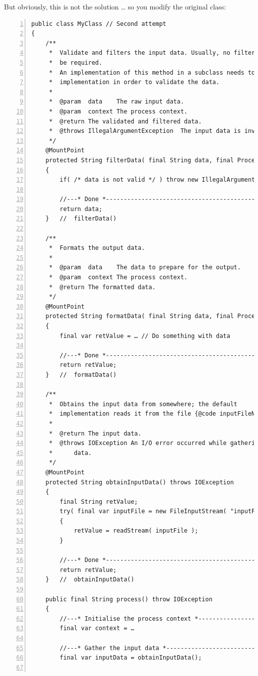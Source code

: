 \documentclass[11pt,a4paper, titlepage, parskip=half, headsepline, footsepline, cleardoublepage=current, headheight=1cm]{scrbook}
\begin{document}
But obviously, this is not the solution … so you modify the original class:
\begin{lstlisting}[numbers=left]
public class MyClass // Second attempt
{
    /**
     *  Validate and filters the input data. Usually, no filtering should
     *  be required.
     *  An implementation of this method in a subclass needs to call this
     *  implementation in order to validate the data.
     *  
     *  @param  data    The raw input data.
     *  @param  context The process context.
     *  @return	The validated and filtered data.
     *  @throws IllegalArgumentException  The input data is invalid.
     */
    @MountPoint 
    protected String filterData( final String data, final ProcessContext context )
    {
        if( /* data is not valid */ ) throw new IllegalArgumentException();
        
        //---* Done *------------------------------------------------
        return data;
    }   //  filterData()
    
    /**
     *  Formats the output data.
     * 
     *  @param  data    The data to prepare for the output.
     *  @param  context The process context.
     *  @return	The formatted data.
     */
    @MountPoint
    protected String formatData( final String data, final ProcessContext context )
    {
        final var retValue = … // Do something with data
        
        //---* Done *------------------------------------------------
        return retValue;
    }   //  formatData()
    
    /**
     *  Obtains the input data from somewhere; the default 
     *  implementation reads it from the file {@code inputFileName}.
     *
     *  @return The input data.
     *  @throws IOException An I/O error occurred while gathering the 
     *      data.
     */
    @MountPoint
    protected String obtainInputData() throws IOException
    {
        final String retValue;
        try( final var inputFile = new FileInputStream( "inputFileName" ) )
        {
            retValue = readStream( inputFile );
        }
        
        //---* Done *------------------------------------------------
        return retValue;
    }   //  obtainInputData()
        
    public final String process() throw IOException
    {
        //---* Initialise the process context *----------------------
        final var context = …
        
        //---* Gather the input data *-------------------------------
        final var inputData = obtainInputData();
        

\end{lstlisting}
\end{document}
